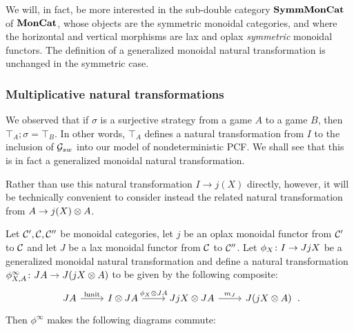 \documentclass{article}
\begin{document}
We will, in fact, be more interested in the sub-double category ${\normalfont\textbf{SymmMonCat}}$ of ${\normalfont\textbf{MonCat}}$, whose objects are the symmetric monoidal categories, and where the horizontal and vertical morphisms are lax and oplax \emph{symmetric} monoidal functors.  
The definition of a generalized monoidal natural transformation is unchanged in the symmetric case.

\subsubsection{Multiplicative natural transformations}

We observed that if $\sigma$ is a surjective strategy from a game $A$ to a game $B$, then $\top_A;\sigma=\top_B$.  
In other words, $\top_A$ defines a natural transformation from $I$ to the inclusion of $\mathcal G_{sw}$ into our model of nondeterministic PCF.  
We shall see that this is in fact a generalized monoidal natural transformation.

Rather than use this natural transformation $I \to j(X)$ directly, however, it will be technically convenient to consider instead the related natural transformation from $A \to j(X) \otimes A$.

\begin{proposition}
  Let ${\mathcal{C}}',{\mathcal{C}},{\mathcal{C}}''$ be monoidal categories, let $j$ be an oplax monoidal functor from ${\mathcal{C}}'$ to ${\mathcal{C}}$ and let $J$ be a lax monoidal functor from ${\mathcal{C}}$ to ${\mathcal{C}}''$.  Let $\phi_X\colon I \to JjX$ be a generalized monoidal natural transformation and define a natural transformation $\phi_{X,A}^\infty\colon JA \to J (jX \otimes A)$ to be given by the following composite:
  \[
    \begin{tikzcd}
      J A \arrow[r, "\lunit"]
        & I \tensor J A \arrow[r, "\phi_X\tensor J A"]
          & J j X \tensor J A \arrow[r, "m_J"]
            & J (j X \tensor A)
    \end{tikzcd}\,.
    \]
  Then $\phi^\infty$ makes the following diagrams commute:
\end{proposition}
\end{document}
